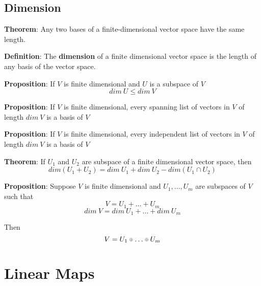 \documentclass[a4paper, 10pt]{report}
\newcommand\smallmath[2]{#1{\raisebox{\dimexpr \fontdimen 22 \textfont 2
      - \fontdimen 22 \scriptscriptfont 2 \relax}{$\scriptscriptstyle #2$}}}
\newcommand\smalloplus{\smallmath\mathbin\oplus}
\begin{document}
\section{Dimension}
\begin{framed}
   \textbf{Theorem}: Any two bases of a finite-dimensional vector space have the same length.
\end{framed}

\begin{framed}
   \textbf{Definition}: The \textbf{dimension} of a finite dimensional vector space is the length of any basis of the vector space.  
\end{framed}

\begin{framed}
   \textbf{Proposition}: If $V$ is finite dimensional and $U$ is a subspace of $V$ 
   \[
     dim\ U \leq dim\ V
   \] 
\end{framed}

\begin{framed}
   \textbf{Proposition}: If $V$ is finite dimensional, every spanning list of vectors in $V$ of length $dim\ V$ is a basis of $V$
\end{framed}

\begin{framed}
   \textbf{Proposition}: If $V$ is finite dimensional, every independent list of vectors in $V$ of length $dim\ V$ is a basis of $V$
\end{framed}

\begin{framed}
   \textbf{Theorem}: If $U_1$ and $U_2$ are subspace of a finite dimensional vector space, then 
   \[
     dim \left( U_1 + U_2  \right)  = dim\ U_1 + dim\ U_2 - dim \left( U_1 \cap U_2 \right) 
   \] 
\end{framed}

\begin{framed}
   \textbf{Proposition}: Suppose $V$ is finite dimensional and $U_1, \hdots, U_m$ are subspaces of $V$ such that
   \[
     V = U_1 + \hdots + U_m
   \] 
   \[
      dim\ V = dim\ U_1 + \hdots + dim\ U_m
   \] 

   Then
   \[
     V = U_1 \smalloplus \hdots \smalloplus U_m
   \] 
\end{framed}

\chapter{Linear Maps}
\end{document}
